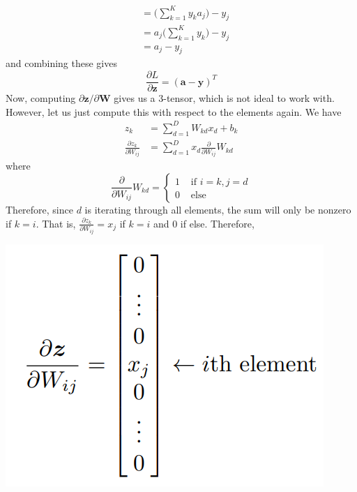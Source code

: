 \documentclass{article}
\begin{document}
\begin{theorem}
\begin{align*}
        & = \bigg( \sum_{k=1}^K y_k a_j \bigg) - y_j \\
        & = a_j \bigg( \sum_{k=1}^K y_k \bigg) - y_j \\
        & = a_j - y_j
      \end{align*}
      and combining these gives 
      \begin{equation}
        \frac{\partial L}{\partial \mathbf{z}} = (\mathbf{a} - \mathbf{y})^T
      \end{equation}
      Now, computing $\partial \mathbf{z} / \partial \mathbf{W}$ gives us a $3$-tensor, which is not ideal to work with. However, let us just compute this with respect to the elements again. We have 
      \begin{align*}
        z_k & = \sum_{d=1}^D W_{kd} x_d + b_k \\ 
        \frac{\partial z_k}{\partial W_{ij}} & = \sum_{d=1}^D x_d \frac{\partial}{\partial W_{ij}} W_{kd}
      \end{align*}
      where 
      \begin{equation}
        \frac{\partial}{\partial W_{ij}} W_{kd} = \begin{cases} 1 & \text{ if } i = k, j = d \\ 0 & \text{ else} \end{cases}
      \end{equation}
      Therefore, since $d$ is iterating through all elements, the sum will only be nonzero if $k = i$. That is, $\frac{\partial z_k}{\partial W_{ij}} = x_j$ if $k = i$ and $0$ if else. Therefore, 
      \begin{center}
        \includegraphics[scale=0.3]{img/softmax_deriv.png}
      \end{center}

\end{theorem}
\end{document}
